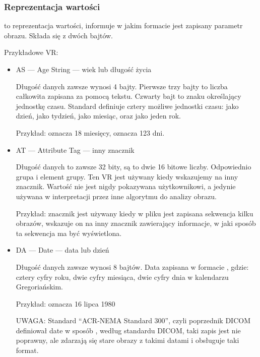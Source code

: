 \subsubsection{Reprezentacja wartości}
\label{sec:dicom-vr}

 to reprezentacja wartości, informuje w jakim formacie jest zapisany parametr obrazu.
Składa się z dwóch bajtów.

Przykładowe VR:
\begin{itemize}
    \item AS --- Age String --- wiek lub długość życia

          Długość danych zawsze wynosi 4 bajty.
          Pierwsze trzy bajty to liczba całkowita zapisana za pomocą tekstu.
          Czwarty bajt to znaku określający jednostkę czasu.
          Standard definiuje cztery możliwe jednostki czasu:  jako dzień,  jako tydzień,  jako miesiąc, oraz  jako jeden rok.

          Przykład:  oznacza 18 miesięcy,  oznacza 123 dni.

    \item AT --- Attribute Tag --- inny znacznik

          Długość danych to zawsze 32 bity, są to dwie 16 bitowe liczby.
          Odpowiednio grupa i element grupy.
          Ten VR jest używany kiedy wskazujemy na inny znacznik.
          Wartość nie jest nigdy pokazywana użytkownikowi, a jedynie używana w interpretacji przez inne algorytmu do analizy obrazu.

          Przykład: znacznik  jest używany kiedy w pliku jest zapisana sekwencja kilku obrazów, wskazuje on na inny znacznik zawierający informacje, w jaki sposób ta sekwencja ma być wyświetlona.

    \item DA --- Date --- data lub dzień

          Długość danych zawsze wynosi 8 bajtów.
          Data zapisana w formacie , gdzie:  cztery cyfry roku,  dwie cyfry miesiąca,  dwie cyfry dnia w kalendarzu Gregoriańskim.

          Przykład:  oznacza 16 lipca 1980

          UWAGA: Standard \enquote{ACR-NEMA Standard 300}, czyli poprzednik DICOM definiował date w sposób , według standardu DICOM, taki zapis jest nie poprawny, ale zdarzają się stare obrazy z takimi datami i  obsługuje taki format.


\end{itemize}
